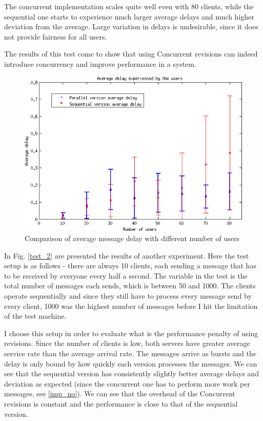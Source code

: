 \documentclass[12pt,twoside,notitlepage]{report}
\begin{document}
The concurrent implementation scales quite well even with 80 clients, while the sequential one starts to experience much larger average delays and much higher deviation from the average. Large variation in delays is undesirable, since it does not provide fairness for all users.  

The results of this test come to show that using Concurrent revisions can indeed introduce concurrency and improve performance in a system. 

    
\begin{figure}[ht!]
\centering
\includegraphics[width=135mm]{plot_users.png}
\caption{Comparison of average message delay with different number of users}
\label{test_1}
\end{figure}


In Fig. \ref{test_2} are presented the results of another experiment. Here the test setup is as follows - there are always 10 clients, each sending a message that has to be received by everyone every half a second. The variable in the test is the total number of messages each sends, which is between 50 and 1000. The clients operate sequentially and since they still have to process every message send by every client, 1000 was the highest number of messages before I hit the limitation of the test machine.  

I choose this setup in order to evaluate what is the performance penalty of using revisions. Since the number of clients is low, both servers have greater average service rate than the average arrival rate. The messages arrive as bursts and the delay is only bound by how quickly each version processes the messages. We can see that the sequential version has consistently slightly better average delays and deviation as expected (since the concurrent one has to perform more work per messages, see \ref{imp_no}). We can see that the overhead of the Concurrent revisions is constant and the performance is close to that of the sequential version.
  
\end{document}
